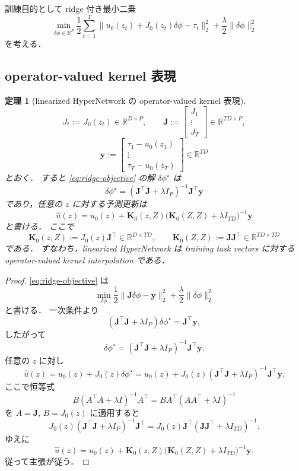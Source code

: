 \documentclass[a4paper,11pt]{bxjsarticle}
\newtheorem{theorem}{定理}[section]
\theoremstyle{definition}
\begin{document}
訓練目的として ridge 付き最小二乗
\begin{equation}
\label{eq:ridge-objective}
\min_{\delta\phi\in\mathbb{R}^P}
\frac12 \sum_{t=1}^T \|u_0(z_t)+J_0(z_t)\delta\phi-\tau_t\|_2^2
+
\frac{\lambda}{2}\|\delta\phi\|_2^2
\end{equation}
を考える．

\subsection{operator-valued kernel 表現}

\begin{theorem}[linearized HyperNetwork の operator-valued kernel 表現]
\label{thm:operator-kernel}
\[
J_t:=J_0(z_t)\in\mathbb{R}^{D\times P},\qquad
\mathbf{J}:=
\begin{bmatrix}
J_1 \\ \vdots \\ J_T
\end{bmatrix}
\in \mathbb{R}^{TD\times P},
\]
\[
\mathbf{y}:=
\begin{bmatrix}
\tau_1-u_0(z_1)\\
\vdots\\
\tau_T-u_0(z_T)
\end{bmatrix}
\in \mathbb{R}^{TD}
\]
とおく．
すると \eqref{eq:ridge-objective} の解 $\delta\phi^\star$ は
\[
\delta\phi^\star=(\mathbf{J}^\top\mathbf{J}+\lambda I_P)^{-1}\mathbf{J}^\top \mathbf{y}
\]
であり，任意の $z$ に対する予測更新は
\[
\hat u(z)
=
u_0(z)+\mathbf{K}_0(z,Z)\bigl(\mathbf{K}_0(Z,Z)+\lambda I_{TD}\bigr)^{-1}\mathbf{y}
\]
と書ける．
ここで
\[
\mathbf{K}_0(z,Z):=J_0(z)\mathbf{J}^\top \in \mathbb{R}^{D\times TD},
\qquad
\mathbf{K}_0(Z,Z):=\mathbf{J}\mathbf{J}^\top \in \mathbb{R}^{TD\times TD}
\]
である．
すなわち，linearized HyperNetwork は training task vectors に対する operator-valued kernel interpolation である．
\end{theorem}

\begin{proof}
\eqref{eq:ridge-objective} は
\[
\min_{\delta\phi}
\frac12\|\mathbf{J}\delta\phi-\mathbf{y}\|_2^2+\frac{\lambda}{2}\|\delta\phi\|_2^2
\]
と書ける．
一次条件より
\[
(\mathbf{J}^\top\mathbf{J}+\lambda I_P)\delta\phi^\star=\mathbf{J}^\top\mathbf{y},
\]
したがって
\[
\delta\phi^\star=(\mathbf{J}^\top\mathbf{J}+\lambda I_P)^{-1}\mathbf{J}^\top\mathbf{y}.
\]
任意の $z$ に対し
\[
\hat u(z)=u_0(z)+J_0(z)\delta\phi^\star
=
u_0(z)+J_0(z)(\mathbf{J}^\top\mathbf{J}+\lambda I_P)^{-1}\mathbf{J}^\top\mathbf{y}.
\]
ここで恒等式
\[
B(A^\top A+\lambda I)^{-1}A^\top
=
BA^\top(AA^\top+\lambda I)^{-1}
\]
を $A=\mathbf{J},\,B=J_0(z)$ に適用すると
\[
J_0(z)(\mathbf{J}^\top\mathbf{J}+\lambda I_P)^{-1}\mathbf{J}^\top
=
J_0(z)\mathbf{J}^\top(\mathbf{J}\mathbf{J}^\top+\lambda I_{TD})^{-1}.
\]
ゆえに
\[
\hat u(z)
=
u_0(z)+\mathbf{K}_0(z,Z)\bigl(\mathbf{K}_0(Z,Z)+\lambda I_{TD}\bigr)^{-1}\mathbf{y}.
\]
従って主張が従う．
\end{proof}
\end{document}
